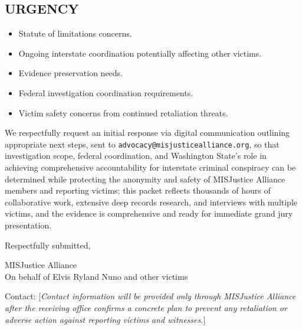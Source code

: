 \documentclass[12pt,oneside]{article}
\begin{document}
\begin{flushleft}
\section*{URGENCY}

\begin{itemize}
\item Statute of limitations concerns.
\item Ongoing interstate coordination potentially affecting other victims.
\item Evidence preservation needs.
\item Federal investigation coordination requirements.
\item Victim safety concerns from continued retaliation threats.
\end{itemize}

We respectfully request an initial response via digital communication outlining appropriate next steps, sent to \texttt{advocacy@misjusticealliance.org}, so that investigation scope, federal coordination, and Washington State’s role in achieving comprehensive accountability for interstate criminal conspiracy can be determined while protecting the anonymity and safety of MISJustice Alliance members and reporting victims; this packet reflects thousands of hours of collaborative work, extensive deep records research, and interviews with multiple victims, and the evidence is comprehensive and ready for immediate grand jury presentation.

\vspace{0.3in}

\noindent
Respectfully submitted,

\vspace{0.3in}

\noindent
MISJustice Alliance \\
On behalf of Elvis Ryland Nuno and other victims

\vspace{0.2in}

\noindent
Contact: [\textit{Contact information will be provided only through MISJustice Alliance after the receiving office confirms a concrete plan to prevent any retaliation or adverse action against reporting victims and witnesses.}]

\end{flushleft}
\end{document}
